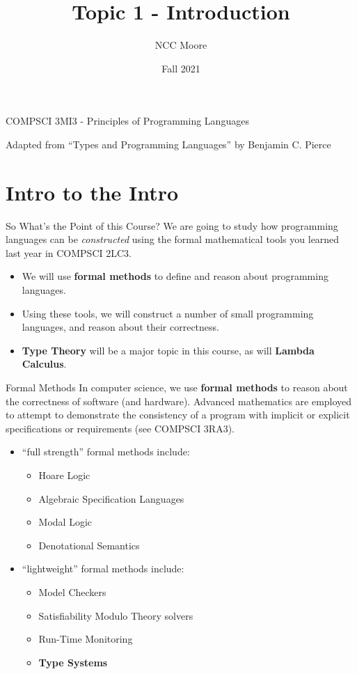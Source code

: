 \documentclass[11pt]{beamer}
\author{NCC Moore}
\title{Topic 1 - Introduction}
\institute{McMaster University}
\date{Fall 2021}
\begin{document}
\begin{frame}
\center
COMPSCI 3MI3 - Principles of Programming Languages
\titlepage

Adapted from ``Types and Programming Languages'' by Benjamin C. Pierce 
\end{frame}

\begin{frame}
\tableofcontents
\end{frame}

\section[Intro]{Intro to the Intro}
\begin{frame}[fragile=singleslide]{So What's the Point of this Course?}
We are going to study how programming languages can be \emph{constructed} using the formal mathematical tools you learned last year in COMPSCI 2LC3.
\begin{itemize}
\item We will use \textbf{formal methods} to define and reason about programming languages.  
\item Using these tools, we will construct a number of small programming languages, and reason about their correctness.  
\item \textbf{Type Theory} will be a major topic in this course, as will \textbf{Lambda Calculus}.  
\end{itemize}
\end{frame}

\begin{frame}[fragile=singleslide]{Formal Methods}
In computer science, we use \textbf{formal methods} to reason about the correctness of software (and hardware).  Advanced mathematics are employed to attempt to demonstrate the consistency of a program with implicit or explicit specifications or requirements (see COMPSCI 3RA3).  
\begin{itemize}
\item ``full strength'' formal methods include:
	\begin{itemize}
	\item Hoare Logic
	\item Algebraic Specification Languages
	\item Modal Logic
	\item Denotational Semantics
	\end{itemize}
\item ``lightweight'' formal methods include:
	\begin{itemize}
	\item Model Checkers
	\item Satisfiability Modulo Theory solvers
	\item Run-Time Monitoring
	\item \textbf{Type Systems}
	\end{itemize}
\end{itemize}
\end{frame}
         
\end{document}
